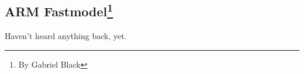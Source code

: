 \subsection[ARM Fastmodel]{ARM Fastmodel\footnote{By Gabriel Black}}

Haven't heard anything back, yet.
